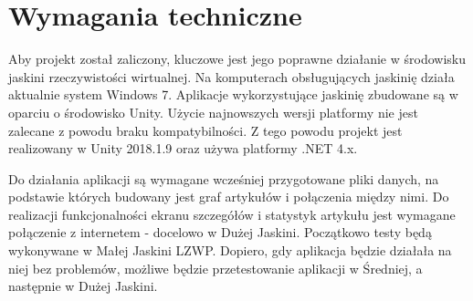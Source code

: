 \section{Wymagania techniczne}
Aby projekt został zaliczony, kluczowe jest jego poprawne działanie w środowisku jaskini rzeczywistości wirtualnej. Na komputerach obsługujących jaskinię działa aktualnie system Windows 7. Aplikacje wykorzystujące jaskinię zbudowane są w oparciu o środowisko Unity. Użycie najnowszych wersji platformy nie jest zalecane z powodu braku kompatybilności. Z tego powodu projekt jest realizowany w Unity 2018.1.9 oraz używa platformy .NET 4.x.

Do działania aplikacji są wymagane wcześniej przygotowane pliki danych, na podstawie których budowany jest graf artykułów i połączenia między nimi. Do realizacji funkcjonalności ekranu szczegółów i statystyk artykułu jest wymagane połączenie z internetem - docelowo w Dużej Jaskini. Początkowo testy będą wykonywane w Małej Jaskini LZWP. Dopiero, gdy aplikacja będzie działała na niej bez problemów, możliwe będzie przetestowanie aplikacji w Średniej, a następnie w Dużej Jaskini.
\newpage